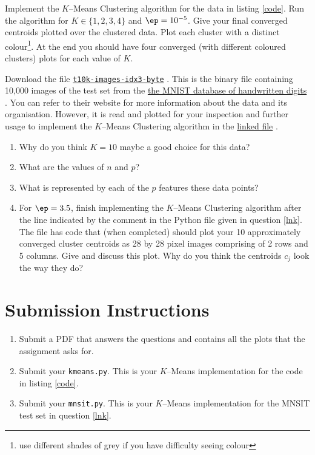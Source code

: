\documentclass{homework}
\newcommand\sharepoint{%
  \href{%
    https://myokcuedu-my.sharepoint.com/:u:/g/personal/tashfeen_okcu_edu/EeqU1CH36W5Bp0YRgiRXxxUBuhzdI_JPec6CBlxsMBCtgA%
  }{\texttt{t10k-images-idx3-byte}}%
}
\newcommand\webarchive{%
  \href{%
    https://web.archive.org/web/20170130040655/https://yann.lecun.com/exdb/mnist/%
  }{the MNIST database of handwritten digits}%
}
\newcommand\linkedfile{%
  \href{%
    https://tashfeen.org/s/ml/mnist.py%
  }{linked file}%
}
\begin{document}
\question Implement the $K$--Means Clustering algorithm for the data
in listing \ref{code}. Run the algorithm for $K \in \{1, 2, 3, 4\}$
and $\ep = 10^{-5}$. Give your final converged centroids plotted over
the clustered data. Plot each cluster with a distinct
colour\footnote{use different shades of grey if you have difficulty
  seeing colour}. At the end you should have four converged (with
different coloured clusters) plots for each value of $K$.


\question\label{lnk} Download the file \sharepoint. This is the binary
file containing 10,000 images of the test set from the
\webarchive. You can refer to their website for more information about
the data and its organisation. However, it is read and plotted for
your inspection and further usage to implement the $K$--Means
Clustering algorithm in the \linkedfile.

\begin{enumerate}
  \item Why do you think $K=10$ maybe a good choice for this data?
  \item What are the values of $n$ and $p$?
  \item What is represented by each of the $p$ features these data points?
  \item For $\ep = 3.5$, finish implementing the $K$--Means Clustering
        algorithm after the line indicated by the comment in the Python file
        given in question \ref{lnk}. The file has code that (when completed)
        should plot your 10 approximately converged cluster centroids as 28
        by 28 pixel images comprising of 2 rows and 5 columns. Give and
        discuss this plot. Why do you think the centroids $c_j$ look the way
        they do?
\end{enumerate}

\section*{Submission Instructions}
\begin{enumerate}
  \item Submit a PDF that answers the questions and contains all the
        plots that the assignment asks for.
  \item Submit your \texttt{kmeans.py}. This is your $K$--Means
        implementation for the code in listing \ref{code}.
  \item Submit your \texttt{mnsit.py}. This is your $K$--Means
        implementation for the MNSIT test set in question \ref{lnk}.
\end{enumerate}
\end{document}
